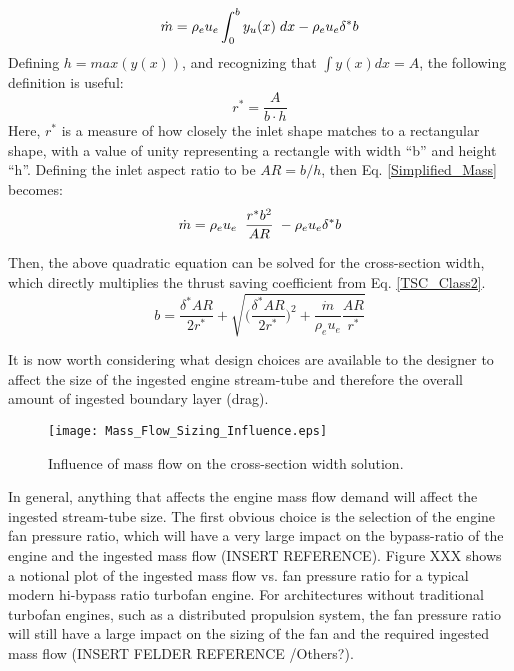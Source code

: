 					\begin{equation}
						\dot{m} = \rho_e u_e \int_0^b y_u(x) \hspace{1mm} dx - \rho_e u_e \delta^* b
						\label{Simplified_Mass}
					\end{equation}
					Defining $h = max(y(x))$, and recognizing that $\int y(x)dx = A$, the following definition is useful:
					\begin{equation}
						r^* = \frac{\displaystyle A}{b \cdot h}
					\end{equation}
					Here, $r^*$ is a measure of how closely the inlet shape matches to a rectangular shape, with a value of unity representing a rectangle with width ``b'' and height ``h''.  Defining the inlet aspect ratio to be $AR = b / h$, then Eq. \ref{Simplified_Mass} becomes:
					\begin{equation}
						\dot{m} = \rho_e u_e \hspace{1mm} \hspace{1mm} \frac{r^* b^2}{AR} \hspace{1mm} - \rho_e u_e \delta^* b
					\end{equation}
											
					Then, the above quadratic equation can be solved for the cross-section width, which directly multiplies the thrust saving coefficient from Eq. \ref{TSC_Class2}.
					\begin{equation}
						b = \frac{\delta^* AR}{2r^*} + \sqrt{\Big(\frac{\delta^* AR}{2r^*}\Big)^2 + \frac{\dot{m}}{\rho_e u_e}\frac{AR}{r^*}}
					\end{equation}
									 																		
					It is now worth considering what design choices are available to the designer to affect the size of the ingested engine stream-tube and therefore the overall amount of ingested boundary layer (drag).  
					\begin{figure}[htp]
						\centering
						\vspace{0mm}
						\texttt{[image: Mass\_Flow\_Sizing\_Influence.eps]}
						\caption{Influence of mass flow on the cross-section width solution.}
						\label{Mass_Flow_Sizing_Influence}
					\end{figure}
					
					In general, anything that affects the engine mass flow demand will affect the ingested stream-tube size.  The first obvious choice is the selection of the engine fan pressure ratio, which will have a very large impact on the bypass-ratio of the engine and the ingested mass flow (INSERT REFERENCE).  Figure XXX shows a notional plot of the ingested mass flow vs. fan pressure ratio for a typical modern hi-bypass ratio turbofan engine.  For architectures without traditional turbofan engines, such as a distributed propulsion system, the fan pressure ratio will still have a large impact on the sizing of the fan and the required ingested mass flow (INSERT FELDER REFERENCE /Others?).  
					
